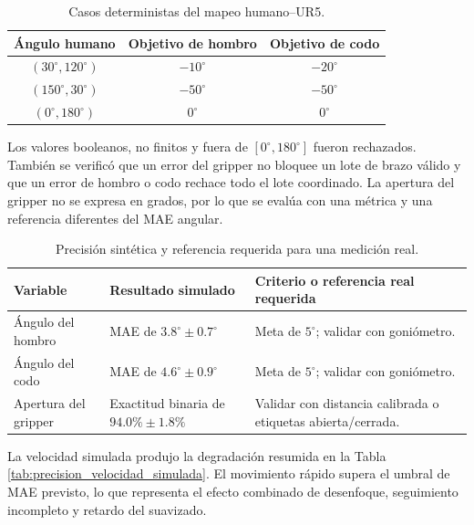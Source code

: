 \begin{table}[H]
    \centering
    \renewcommand{\arraystretch}{1.2}
    \begin{tabular}{ccc}
        \toprule
        \textbf{Ángulo humano} &
        \textbf{Objetivo de hombro} &
        \textbf{Objetivo de codo} \\
        \midrule
        $(30^\circ,120^\circ)$ & $-10^\circ$ & $-20^\circ$ \\
        $(150^\circ,30^\circ)$ & $-50^\circ$ & $-50^\circ$ \\
        $(0^\circ,180^\circ)$ & $0^\circ$ & $0^\circ$ \\
        \bottomrule
    \end{tabular}
    \caption{Casos deterministas del mapeo humano--UR5.}
    \label{tab:mapeo_determinista}
\end{table}

Los valores booleanos, no finitos y fuera de $[0^\circ,180^\circ]$ fueron
rechazados. También se verificó que un error del gripper no bloquee un lote de
brazo válido y que un error de hombro o codo rechace todo el lote coordinado.
La apertura del gripper no se expresa en grados, por lo que se evalúa con una
métrica y una referencia diferentes del MAE angular.

\begin{table}[H]
    \centering
    \renewcommand{\arraystretch}{1.2}
    \begin{tabularx}{\textwidth}{X p{3.8cm} X}
        \toprule
        \textbf{Variable} & \textbf{Resultado simulado} &
        \textbf{Criterio o referencia real requerida} \\
        \midrule
        Ángulo del hombro & MAE de $3.8^\circ\pm0.7^\circ$ &
        Meta de $5^\circ$; validar con goniómetro. \\
        Ángulo del codo & MAE de $4.6^\circ\pm0.9^\circ$ &
        Meta de $5^\circ$; validar con goniómetro. \\
        Apertura del gripper & Exactitud binaria de $94.0\%\pm1.8\%$ &
        Validar con distancia calibrada o etiquetas abierta/cerrada. \\
        \bottomrule
    \end{tabularx}
    \caption{Precisión sintética y referencia requerida para una medición real.}
    \label{tab:resultados_precision}
\end{table}

La velocidad simulada produjo la degradación resumida en la Tabla
\ref{tab:precision_velocidad_simulada}. El movimiento rápido supera el umbral
de MAE previsto, lo que representa el efecto combinado de desenfoque,
seguimiento incompleto y retardo del suavizado.

